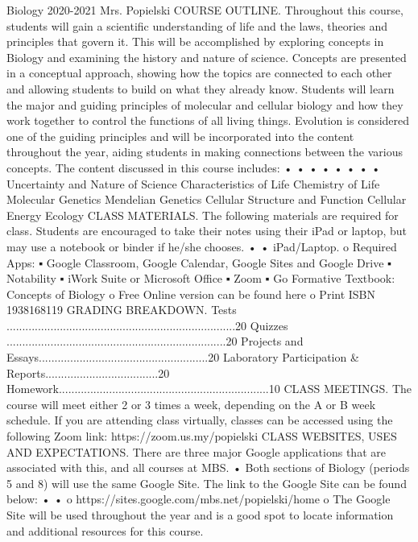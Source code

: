 Biology
2020-2021
Mrs. Popielski
COURSE OUTLINE.
Throughout this course, students will gain a scientific understanding of life and the laws,
theories and principles that govern it. This will be accomplished by exploring concepts in Biology
and examining the history and nature of science. Concepts are presented in a conceptual
approach, showing how the topics are connected to each other and allowing students to build
on what they already know. Students will learn the major and guiding principles of molecular
and cellular biology and how they work together to control the functions of all living things.
Evolution is considered one of the guiding principles and will be incorporated into the content
throughout the year, aiding students in making connections between the various concepts. The
content discussed in this course includes:
•
•
•
•
•
•
•
•
Uncertainty and Nature of Science
Characteristics of Life
Chemistry of Life
Molecular Genetics
Mendelian Genetics
Cellular Structure and Function
Cellular Energy
Ecology
CLASS MATERIALS.
The following materials are required for class. Students are encouraged to take their notes
using their iPad or laptop, but may use a notebook or binder if he/she chooses.
•
•
iPad/Laptop.
o Required Apps:
▪ Google Classroom, Google Calendar, Google Sites and Google Drive
▪ Notability
▪ iWork Suite or Microsoft Office
▪ Zoom
▪ Go Formative
Textbook: Concepts of Biology
o Free Online version can be found here
o Print ISBN 1938168119
GRADING BREAKDOWN.
Tests .........................................................................20%
Quizzes ......................................................................20%
Projects and Essays......................................................20%
Laboratory Participation & Reports....................................20%
Homework...................................................................10%
CLASS MEETINGS.
The course will meet either 2 or 3 times a week, depending on the A or B week schedule.
If you are attending class virtually, classes can be accessed using the following Zoom link:
https://zoom.us.my/popielski
CLASS WEBSITES, USES AND EXPECTATIONS.
There are three major Google applications that are associated with this, and all courses at MBS.
• Both sections of Biology (periods 5 and 8) will use the same Google Site. The link to the
Google Site can be found below:
•
•
o https://sites.google.com/mbs.net/popielski/home
o The Google Site will be used throughout the year and is a good spot to locate
information and additional resources for this course.
